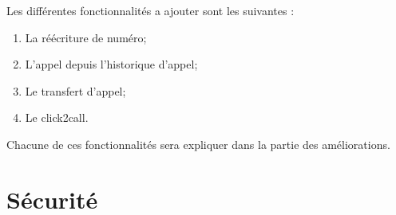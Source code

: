 Les différentes fonctionnalités a ajouter sont les suivantes :

\begin{enumerate}
	\item La réécriture de numéro;
	\item L'appel depuis l'historique d'appel;
	\item Le transfert d'appel;
	\item Le click2call.
\end{enumerate}

Chacune de ces fonctionnalités sera expliquer dans la partie des améliorations.

\section{Sécurité}